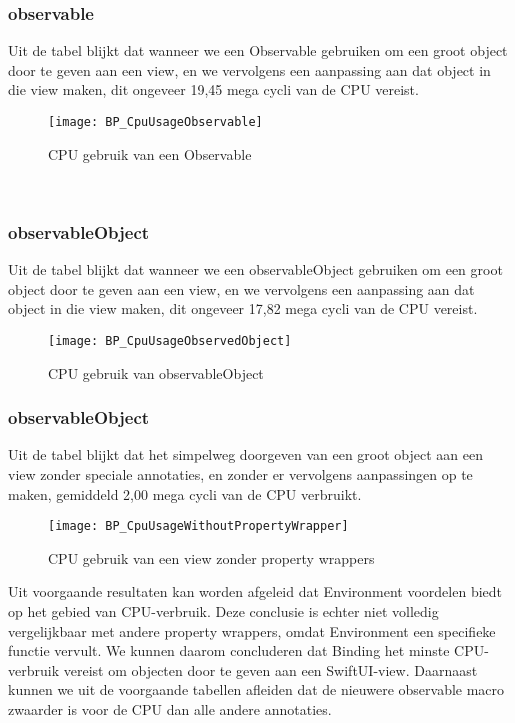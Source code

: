 \subsubsection{observable}
Uit de tabel blijkt dat wanneer we een Observable gebruiken om een groot object door te geven aan een view, en we vervolgens een aanpassing aan dat object in die view maken, dit ongeveer 19,45 mega cycli van de CPU vereist.
\begin{figure}[htbp]
    \centering
    \texttt{[image: BP\_CpuUsageObservable]} 
    \caption{CPU gebruik van een Observable}
    \label{fig:cpuObservable}
\end{figure}\

\subsubsection{observableObject}
Uit de tabel blijkt dat wanneer we een observableObject gebruiken om een groot object door te geven aan een view, en we vervolgens een aanpassing aan dat object in die view maken, dit ongeveer 17,82 mega cycli van de CPU vereist.
\begin{figure}[htbp]
    \centering
    \texttt{[image: BP\_CpuUsageObservedObject]} 
    \caption{CPU gebruik van observableObject}
    \label{fig:cpuObservedObject}
\end{figure}

\subsubsection{observableObject}
Uit de tabel blijkt dat het simpelweg doorgeven van een groot object aan een view zonder speciale annotaties, en zonder er vervolgens aanpassingen op te maken, gemiddeld 2,00 mega cycli van de CPU verbruikt.
\begin{figure}[htbp]
    \centering
    \texttt{[image: BP\_CpuUsageWithoutPropertyWrapper]} 
    \caption{CPU gebruik van een view zonder property wrappers}
    \label{fig:cpuWithoutPropertyWrapper}
\end{figure}

Uit voorgaande resultaten kan worden afgeleid dat Environment voordelen biedt op het gebied van CPU-verbruik. Deze conclusie is echter niet volledig vergelijkbaar met andere property wrappers, omdat Environment een specifieke functie vervult. We kunnen daarom concluderen dat Binding het minste CPU-verbruik vereist om objecten door te geven aan een SwiftUI-view. Daarnaast kunnen we uit de voorgaande tabellen afleiden dat de nieuwere observable macro zwaarder is voor de CPU dan alle andere annotaties.

